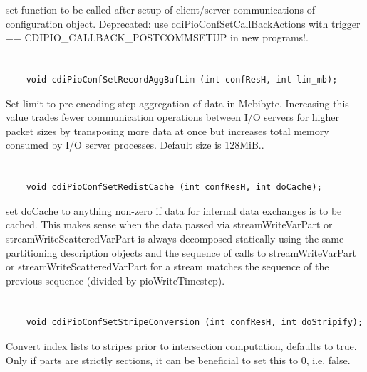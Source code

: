 set function to be called after
setup of client/server communications of configuration object.
Deprecated: use cdiPioConfSetCallBackActions with
trigger == CDIPIO_CALLBACK_POSTCOMMSETUP in new programs!.


\section*{\tt {}}

\begin{verbatim}
    void cdiPioConfSetRecordAggBufLim (int confResH, int lim_mb);
\end{verbatim}

Set limit to pre-encoding step
aggregation of data in Mebibyte. Increasing this value trades fewer
communication operations between I/O servers for higher packet
sizes by transposing more data at once but increases total memory
consumed by I/O server processes.  Default size is 128MiB..


\section*{\tt {}}

\begin{verbatim}
    void cdiPioConfSetRedistCache (int confResH, int doCache);
\end{verbatim}

set doCache to anything non-zero if data
for internal data exchanges is to be cached. This makes sense when
the data passed via streamWriteVarPart or streamWriteScatteredVarPart
is always decomposed statically using the same partitioning
description objects and the sequence of calls to streamWriteVarPart
or streamWriteScatteredVarPart for a stream matches the sequence
of the previous sequence (divided by pioWriteTimestep).


\section*{\tt {}}

\begin{verbatim}
    void cdiPioConfSetStripeConversion (int confResH, int doStripify);
\end{verbatim}

Convert index lists to stripes prior
to intersection computation, defaults to true. Only if parts are
strictly sections, it can be beneficial to set this to 0, i.e. false.



